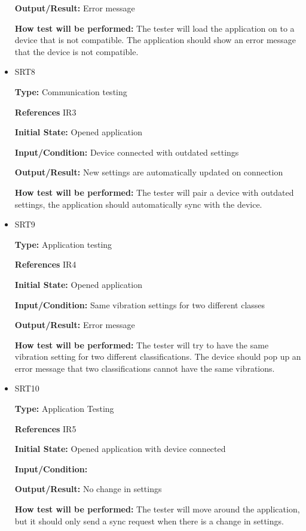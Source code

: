 \documentclass[12pt, titlepage]{article}
\begin{document}
\begin{itemize}
\textbf{Output/Result:} Error message
					
\textbf{How test will be performed:} The tester will load the application on to a device that is not compatible. The application should show an error message that the device is not compatible.

\item{SRT8} 

\textbf{Type:} Communication testing

\textbf{References} IR3 
					
\textbf{Initial State:} Opened application  
					
\textbf{Input/Condition:} Device connected with outdated settings
					
\textbf{Output/Result:} New settings are automatically updated on connection
					
\textbf{How test will be performed:} The tester will pair a device with outdated settings, the application should automatically sync with the device.
 
\item{SRT9} 

\textbf{Type:} Application testing

\textbf{References} IR4 
					
\textbf{Initial State:} Opened application  
					
\textbf{Input/Condition:} Same vibration settings for two different classes
					
\textbf{Output/Result:} Error message
					
\textbf{How test will be performed:} The tester will try to have the same vibration setting for two different classifications. The device should pop up an error message that two classifications cannot have the same vibrations.

\item{SRT10} 

\textbf{Type:} Application Testing

\textbf{References} IR5 
					
\textbf{Initial State:} Opened application with device connected  
					
\textbf{Input/Condition:}
					
\textbf{Output/Result:} No change in settings
					
\textbf{How test will be performed:} The tester will move around the application, but it should only send a sync request when there is a change in settings.


\end{itemize}
\end{document}

